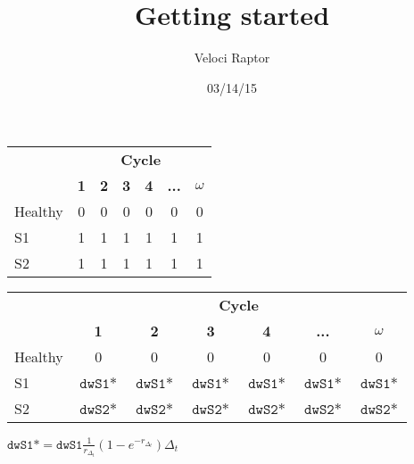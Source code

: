 \documentclass[12pt]{article}
\title{Getting started}
\author{Veloci Raptor}
\date{03/14/15}
\begin{document}
\begin{table}[h!]
\centering
\begin{tabular}{|l|c|c|c|c|c|c|}
\hline
& \multicolumn{6}{c|}{\textbf{Cycle}} \\ \cline{2-7}
 & \textbf{1} & \textbf{2} & \textbf{3} & \textbf{4} & \textbf{...} & \textbf{$\omega$} \\ \hline
Healthy & 0 & 0 & 0 & 0 & 0 & 0 \\ \hline
S1 & 1 & 1 & 1 & 1 & 1  & 1   \\ \hline
S2 & 1 & 1 & 1 & 1 & 1  & 1   \\ \hline
\end{tabular}
\end{table}



\begin{table}[h!]
\centering
\begin{tabular}{|l|c|c|c|c|c|c|}
\hline
 & \multicolumn{6}{c|}{\textbf{Cycle}} \\ \cline{2-7}
& \textbf{1} & \textbf{2} & \textbf{3} & \textbf{4} & \textbf{...} & \textbf{$\omega$} \\ \hline
Healthy & 0 & 0 & 0 & 0 & 0 & 0 \\ \hline
S1 & $\texttt{dwS1}*$ & $\texttt{dwS1}*$  & $\texttt{dwS1}*$ & $\texttt{dwS1}*$ & $\texttt{dwS1}*$  & $\texttt{dwS1}*$    \\ \hline
S2 & $\texttt{dwS2}*$ & $\texttt{dwS2}*$  & $\texttt{dwS2}*$ & $\texttt{dwS2}*$&  $\texttt{dwS2}*$  & $\texttt{dwS2}*$    \\ \hline
\end{tabular}
\end{table}


$\texttt{dwS1}* = \texttt{dwS1} \frac{1}{r_{\Delta_t}}(1-e^{-r_{\Delta_t}}) \Delta_t$
\end{document}
